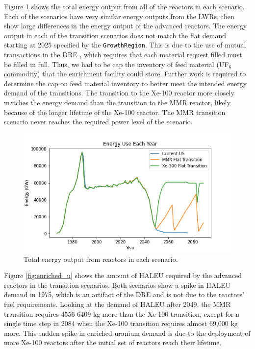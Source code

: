 Figure \ref{fig:energy} shows the total energy output from 
all of the reactors in each scenario. Each of the scenarios
have very similar energy outputs from the \gls{LWR}s, then 
show large differences in the energy output of the advanced 
reactors. The energy output in 
each of the transition scenarios does not match the flat demand 
starting at 2025 specified by the \Cycamore \texttt{GrowthRegion}. 
This is due to 
the use of mutual transactions in the \gls{DRE} 
\cite{gidden_methodology_2016}, which requires that each 
material request filled must be filled in full. Thus, we had to be 
cap the inventory of feed material (UF$_6$ commodity) that 
the enrichment facility could store. Further work is required 
to determine the cap on feed material inventory to better meet 
the intended energy demand of the transitions. The transition to 
the Xe-100 reactor more closely matches the energy demand than the 
transition to the \gls{MMR} reactor, likely because of the 
longer lifetime of the Xe-100 reactor. The \gls{MMR} transition 
scenario never reaches the required power level of 
the scenario. 

\begin{figure}[ht]
    \centering
    \includegraphics[scale=0.5]{figures/energy_all.png}
    \caption{Total energy output from reactors in each scenario.}
    \label{fig:energy}
\end{figure}

Figure \ref{fig:enriched_u} shows the amount of \gls{HALEU} 
required by the advanced reactors in the transition scenarios. 
Both scenarios show a spike in \gls{HALEU} demand in 1975, which is
an artifact of the \gls{DRE} and is not due to the reactors' fuel 
requirements. Looking at the demand of \gls{HALEU} after 2049, the 
\gls{MMR} transition requires 4556-6409 kg more than the 
Xe-100 transition, except for a single time step in 2084 when 
the Xe-100 transition requires almost 69,000 kg more. This 
sudden spike in enriched uranium demand is due to the 
deployment of more Xe-100 reactors after the initial set 
of reactors reach their lifetime. 

